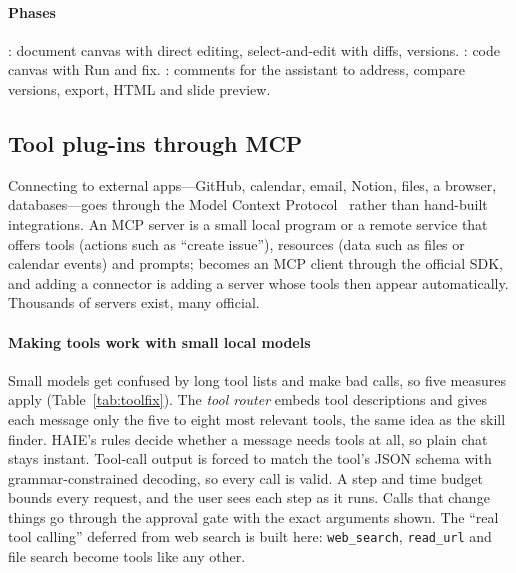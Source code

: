 \paragraph{Phases} : document canvas with direct editing, select-and-edit with diffs, versions. : code canvas with Run and fix. : comments for the assistant to address, compare versions, export, HTML and slide preview.

\subsection{Tool plug-ins through MCP}

Connecting to external apps---GitHub, calendar, email, Notion, files, a browser, databases---goes through the Model Context Protocol~\cite{mcp} rather than hand-built integrations. An MCP server is a small local program or a remote service that offers tools (actions such as ``create issue''), resources (data such as files or calendar events) and prompts; \hivi{} becomes an MCP client through the official SDK, and adding a connector is adding a server whose tools then appear automatically. Thousands of servers exist, many official.

\paragraph{Making tools work with small local models} Small models get confused by long tool lists and make bad calls, so five measures apply (Table~\ref{tab:toolfix}). The \emph{tool router} embeds tool descriptions and gives each message only the five to eight most relevant tools, the same idea as the skill finder. HAIE's rules decide whether a message needs tools at all, so plain chat stays instant. Tool-call output is forced to match the tool's JSON schema with grammar-constrained decoding, so every call is valid. A step and time budget bounds every request, and the user sees each step as it runs. Calls that change things go through the approval gate with the exact arguments shown. The ``real tool calling'' deferred from web search is built here: \texttt{web\_search}, \texttt{read\_url} and file search become tools like any other.

